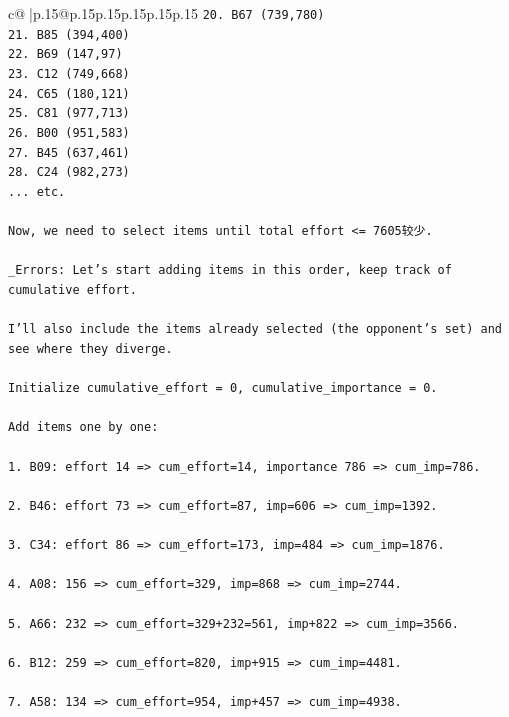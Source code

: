 \documentclass{article}
\begin{document}
{\begin{supertabular}{c@{$\;$}|p{.15\linewidth}@{}p{.15\linewidth}p{.15\linewidth}p{.15\linewidth}p{.15\linewidth}p{.15\linewidth}}
{{{\texttt{20. B67 (739,780)} \\
\texttt{21. B85 (394,400)} \\
\texttt{22. B69 (147,97)} \\
\texttt{23. C12 (749,668)} \\
\texttt{24. C65 (180,121)} \\
\texttt{25. C81 (977,713)} \\
\texttt{26. B00 (951,583)} \\
\texttt{27. B45 (637,461)} \\
\texttt{28. C24 (982,273)} \\
\texttt{... etc.} \\
\\ 
\texttt{Now, we need to select items until total effort <= 7605较少.} \\
\\ 
\texttt{\_Errors: Let's start adding items in this order, keep track of cumulative effort.} \\
\\ 
\texttt{I'll also include the items already selected (the opponent's set) and see where they diverge.} \\
\\ 
\texttt{Initialize cumulative\_effort = 0, cumulative\_importance = 0.} \\
\\ 
\texttt{Add items one by one:} \\
\\ 
\texttt{1. B09: effort 14 => cum\_effort=14, importance 786 => cum\_imp=786.} \\
\\ 
\texttt{2. B46: effort 73 => cum\_effort=87, imp=606 => cum\_imp=1392.} \\
\\ 
\texttt{3. C34: effort 86 => cum\_effort=173, imp=484 => cum\_imp=1876.} \\
\\ 
\texttt{4. A08: 156 => cum\_effort=329, imp=868 => cum\_imp=2744.} \\
\\ 
\texttt{5. A66: 232 => cum\_effort=329+232=561, imp+822 => cum\_imp=3566.} \\
\\ 
\texttt{6. B12: 259 => cum\_effort=820, imp+915 => cum\_imp=4481.} \\
\\ 
\texttt{7. A58: 134 => cum\_effort=954, imp+457 => cum\_imp=4938.} \\
}}}
\end{supertabular}}
\end{document}
